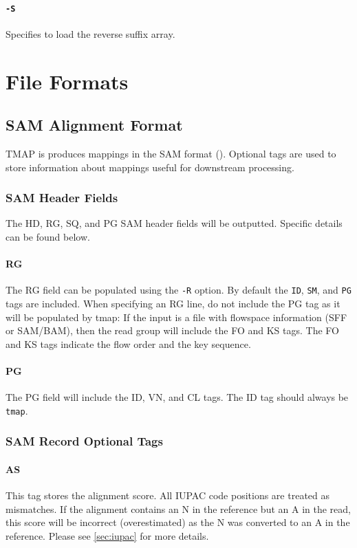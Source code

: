 \documentclass[a4paper,12pt]{book}
\newcommand{\TT}[1]{{\tt #1}} %
\begin{document}
\subsubsection{\TT{-S}}
Specifies to load the reverse suffix array.

\chapter{File Formats}

\section{SAM Alignment Format}
\label{sec:samformat}
TMAP is produces mappings in the SAM format (\cite{SAM-format}).
Optional tags are used to store information about mappings useful for downstream processing.

\subsection{SAM Header Fields}

The HD, RG, SQ, and PG SAM header fields will be outputted.
Specific details can be found below.

\subsubsection{RG}
The RG field can be populated using the \TT{-R} option.
By default the \TT{ID}, \TT{SM}, and \TT{PG} tags are included.
When specifying an RG line, do not include the PG tag as it will be populated by tmap:
If the input is a file with flowspace information (SFF or SAM/BAM), then the read group will include the FO and KS tags.
The FO and KS tags indicate the flow order and the key sequence.

\subsubsection{PG}
The PG field will include the ID, VN, and CL tags.
The ID tag should always be \TT{tmap}.

\subsection{SAM Record Optional Tags}

\subsubsection{AS}
This tag stores the alignment score.
All IUPAC code positions are treated as mismatches.
If the alignment contains an N in the reference but an A in the read, this score will be incorrect (overestimated) as the N was converted to an A in the reference.
Please see \autoref{sec:iupac} for more details. 
\end{document}
